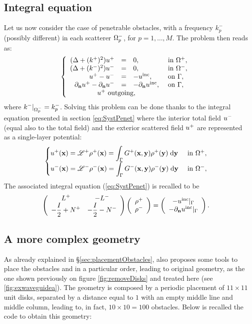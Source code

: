\subsection{Integral equation}
Let us now consider the case of penetrable obstacles, with a frequency $k^-_p$ (possibly different) in each scatterer $\Omega_p^-$, for $p=1,\ldots,M$. The problem then reads as:
$$
\left\{\begin{array}{r c l l}
(\Delta +(k^+)^2)u^+ & = & 0, & \text{ in }\Omegaps,\\
(\Delta +(k^-)^2)u^- & = & 0, & \text{ in }\Omegam,\\
u^+ - u^- & = & -\uinc, & \text{ on }\Gamma,\\
\dn u^+ -\dn u^- & = & -\dn \uinc, & \text{ on }\Gamma,\\
\multicolumn{4}{l}{\qquad \qquad u^+ \text{ outgoing},}
\end{array}\right.
$$
where $k^-|_{\Omega^-_p} = k^-_p$.  Solving this problem can be done thanks to the integral equation presented in section \ref{eq:SystPenet} where the interior total field $u^-$ (equal also to the total field) and the exterior scattered field $u^+$ are represented as a single-layer potential:
$$
\begin{cases}
\displaystyle u^+({\mathbf{x}})  = {\mathscr L}^+\rho^+({\mathbf{x}}) = \int_\Gamma G^+({\mathbf{x}},{\mathbf{y}})\rho^+({\mathbf{y}})\;{\rm d}{\mathbf{y}} & \text{ in }\Omega^+,\\
\displaystyle u^-({\mathbf{x}})  = {\mathscr L}^-\rho^-({\mathbf{x}}) = \int_\Gamma G^-({\mathbf{x}},{\mathbf{y}})\rho^-({\mathbf{y}})\;{\rm d}{\mathbf{y}} & \text{ in }\Omega^-,
\end{cases}
$$
The associated integral equation (\ref{eq:SystPenet}) is recalled to be
$$
\left(\begin{array}{c c}
\displaystyle L^+ & -L^-\\
\displaystyle -\frac{I}{2} + N^+ & \displaystyle -\frac{I}{2} - N^-
\end{array}\right)
\left(\begin{array}{c}
\rho^+\\
\rho^-
\end{array}\right)
=
\left(\begin{array}{c}
-u^{\textrm{inc}}|_\Gamma\\
-\partial_{\mathbf{n}}u^{\textrm{inc}}|_\Gamma
\end{array}\right).
$$

\subsection{A more complex geometry}

As already explained in \S\ref{sec:placementObstacles}, \mudiff also proposes some tools to place the obstacles and in a particular order, leading to original geometry, as the one shown previously on figure \ref{fig:removeDisks} and treated here (see \ref{fig:exwaveguidea}). The geometry is composed by a periodic placement of $11 \times 11$ unit disks, separated by a distance equal to $1$ with an empty middle line and middle column, leading to, in fact, $10 \times 10 = 100$ obstacles. Below is recalled the code to obtain this geometry:

